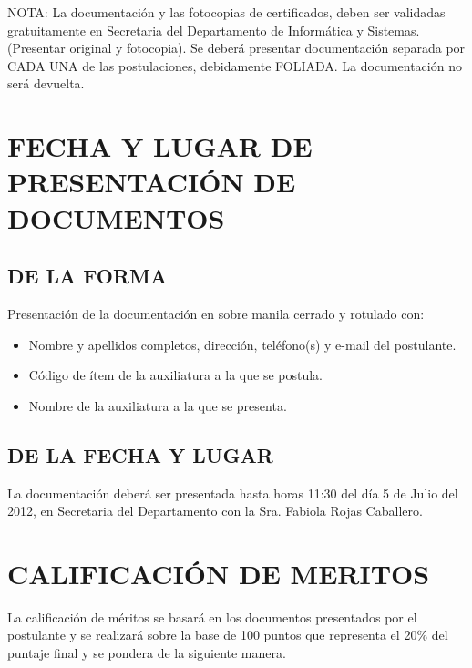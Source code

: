\documentclass[letterpaper,11pt]{article}
\begin{document}
NOTA: La documentación y las fotocopias de certificados, deben ser validadas gratuitamente en Secretaria del Departamento de Informática y Sistemas. (Presentar original y fotocopia). Se deberá presentar documentación separada por CADA UNA de las postulaciones, debidamente FOLIADA. La documentación no será devuelta.

\section{FECHA Y LUGAR DE PRESENTACIÓN DE DOCUMENTOS}
\subsection{DE LA FORMA}
Presentación de la documentación en sobre manila cerrado y rotulado con:

\begin{itemize}
\item Nombre y apellidos completos, dirección, teléfono(s) y e-mail del postulante.
\item Código de ítem de la auxiliatura a la que se postula.
\item Nombre de la auxiliatura a la que se presenta.
\end{itemize}

\subsection{DE LA FECHA Y LUGAR}
La documentación deberá ser presentada hasta horas 11:30 del día 5 de Julio del 2012, en Secretaria del Departamento con la Sra. Fabiola Rojas Caballero.

\section{CALIFICACIÓN DE MERITOS}
La calificación de méritos se basará en los documentos presentados por el postulante y se realizará sobre la base de 100 puntos que representa el 20\% del puntaje final y se pondera de la siguiente manera.
\end{document}

